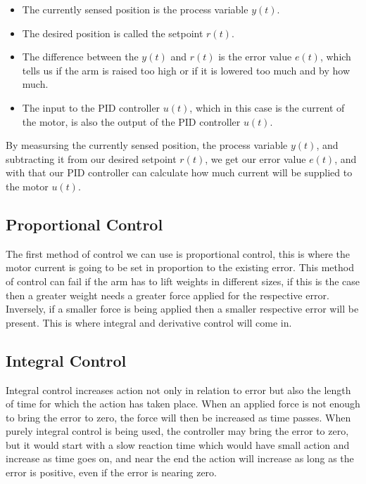 \documentclass[10pt,conference]{IEEEtran}
\begin{document}
\begin{itemize}
    \item The currently sensed position is the process variable \(y(t)\).
    \item The desired position is called the setpoint \(r(t)\).
    \item The difference between the \(y(t)\) and \(r(t)\) is the error value \(e(t)\), which
          tells us if the arm is raised too high or if it is lowered too much and by how much.
    \item The input to the PID controller \(u(t)\), which in this case is the current of the motor, is
          also the output of the PID controller \(u(t)\).
\end{itemize}

By measursing the currently sensed position, the process variable \(y(t)\), and subtracting it from
our desired setpoint \(r(t)\), we get our error value \(e(t)\), and with that our PID controller
can calculate how much current will be supplied to the motor \(u(t)\).

\subsection{Proportional Control}

The first method of control we can use is proportional control, this is where the motor current
is going to be set in proportion to the existing error. This method of control can fail if the
arm has to lift weights in different sizes, if this is the case then a greater weight needs a
greater force applied for the respective error. Inversely, if a smaller force is being applied
then a smaller respective error will be present. This is where integral and derivative control
will come in.

\subsection{Integral Control}

Integral control increases action not only in relation to error but also the length of time
for which the action has taken place. When an applied force is not enough to bring the error
to zero, the force will then be increased as time passes. When purely integral control is
being used, the controller may bring the error to zero, but it would start with a slow
reaction time which would have small action and increase as time goes on, and near the
end the action will increase as long as the error is positive, even if the error is
nearing zero.
\end{document}
